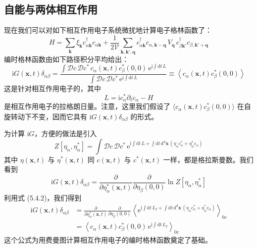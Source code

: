 \subsection{自能与两体相互作用}

现在我们可以对如下相互作用电子系统微扰地计算电子格林函数了：
\begin{equation*}
H=\sum_{\pmb{k}}\xi_{\pmb{k}}c_{\alpha\pmb{k}}^{\dagger}c_{\alpha\pmb{k}}+\frac{1}{2\mathcal{V}}\sum_{\pmb{k},\pmb{k}',\pmb{q}}c_{\alpha\pmb{k}}^{\dagger}c_{\alpha,\pmb{k}-\pmb{q}}\,V_{\pmb{q}}\,c_{\beta\pmb{k}'}^{\dagger}c_{\beta,\pmb{k}'+\pmb{q}}
\end{equation*}
编时格林函数由如下路径积分平均给出：
\begin{equation*}
\mathrm{i}G(\pmb{x},t)\delta_{\alpha\beta}=\frac{\int \mathcal{D}c\,\mathcal{D}c^{*}\,c_{\alpha}(\pmb{x},t)c_{\beta}^{*}(0,0)\,\mathrm{e}^{\mathrm{i}\int \mathrm{d}t\,L}}{\int \mathcal{D}c\,\mathcal{D}c^{*}\,\mathrm{e}^{\mathrm{i}\int \mathrm{d}t\,L}}\equiv\left\langle c_{\alpha}(\pmb{x},t)c_{\beta}^{*}(0,0)\right\rangle
\end{equation*}
这是针对相互作用电子的，其中
\begin{equation*}
L=\mathrm{i}c_{\alpha}^{*}\partial_{t}c_{\alpha}-H
\end{equation*}
是相互作用电子的拉格朗日量。注意，这里我们假设了 $\langle c_{\alpha}(\pmb{x},t)c_{\beta}^{*}(0,0)\rangle$ 在自旋转动下不变，因而它具有 $\mathrm{i}G(\pmb{x},t)\delta_{\alpha\beta}$ 的形式。

为计算 $\mathrm{i}G$，方便的做法是引入
\begin{equation*}
Z[\eta_{\alpha},\eta_{\alpha}^{*}]=\int \mathcal{D}c\,\mathcal{D}c^{*}\,\mathrm{e}^{\mathrm{i}\int \mathrm{d}t\,L+\int \mathrm{d}t\,\mathrm{d}^{d}\pmb{x}\,(\eta_{\alpha}c_{\alpha}^{*}+\eta_{\alpha}^{*}c_{\alpha})}
\end{equation*}
其中 $\eta(\pmb{x},t)$ 与 $\eta^{*}(\pmb{x},t)$ 同 $c(\pmb{x},t)$ 与 $c^{*}(\pmb{x},t)$ 一样，都是格拉斯曼数。我们看到
\begin{equation*}
\mathrm{i}G(\pmb{x},t)\delta_{\alpha\beta}=\frac{\partial}{\partial\eta_{\alpha}^{*}(\pmb{x},t)}\frac{\partial}{\partial\eta_{\beta}(0,0)}\ln Z[\eta_{\alpha},\eta_{\alpha}^{*}]
\end{equation*}
利用式 (5.4.2)，我们得到
\begin{align*}
\mathrm{i}G(\pmb{x},t)\delta_{\alpha\beta} &= \frac{\partial}{\partial\eta_{\alpha}^{*}(\pmb{x},t)}\frac{\partial}{\partial\eta_{\beta}(0,0)}\left\langle \mathrm{e}^{\mathrm{i}\int \mathrm{d}t\,L_{I}+\int \mathrm{d}t\,\mathrm{d}^{d}\pmb{x}\,(\eta_{\alpha}c_{\alpha}^{*}+\eta_{\alpha}^{*}c_{\alpha})}\right\rangle_{0c}\\
&=\left\langle c_{\alpha}(\pmb{x},t)c_{\beta}^{*}(0,0)\,\mathrm{e}^{\mathrm{i}\int \mathrm{d}t\,L_{I}}\right\rangle_{0c} \tag{5.4.3}
\end{align*}
这个公式为用费曼图计算相互作用电子的编时格林函数奠定了基础。

